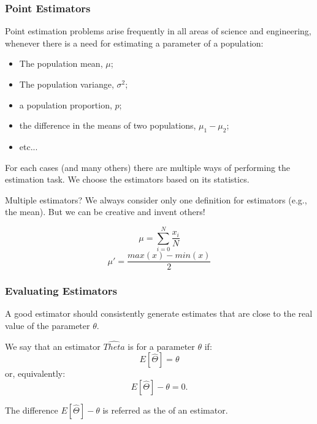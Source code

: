 \documentclass[10pt]{beamer}
\begin{document}
\begin{frame}
  \frametitle{Point Estimators} 

  Point estimation problems arise frequently in all areas of science
  and engineering, whenever there is a need for estimating a parameter
  of a population:
  \begin{itemize}
    \item The population mean, $\mu$;
    \item The population variange, $\sigma^2$;
    \item a population proportion, $p$;
    \item the difference in the means of two populations, $\mu_1 - \mu_2$;
    \item etc...
  \end{itemize}

  For each cases (and many others) there are multiple ways of
  performing the estimation task. We choose the estimators based on
  its statistics.
  
  {\smaller
  \begin{exampleblock}{Multiple estimators?}
    We always consider only one definition for estimators (e.g., the
    mean). But we can be creative and invent others!

    \begin{equation*}
      \mu = \sum^N_{i=0}\frac{x_i}{N}
    \end{equation*}
    \begin{equation*}
      \mu' = \frac{max(x) - min(x)}{2}
    \end{equation*}
  \end{exampleblock}}
\end{frame}

\begin{frame}
  \frametitle{Evaluating Estimators} 

  A good estimator should consistently generate estimates that are
  close to the real value of the parameter $\theta$.

  \bigskip

  We say that an estimator $\hat{Theta}$ is  for a parameter $\theta$ if:
  \begin{equation*}
    E[\hat{\Theta}] = \theta
  \end{equation*}
  or, equivalently:
  \begin{equation*}
    E[\hat{\Theta}] - \theta = 0.
  \end{equation*}

  \bigskip

  The difference $E[\hat{\Theta}] - \theta$ is referred as the
   of an estimator.

\end{frame}
\end{document}

